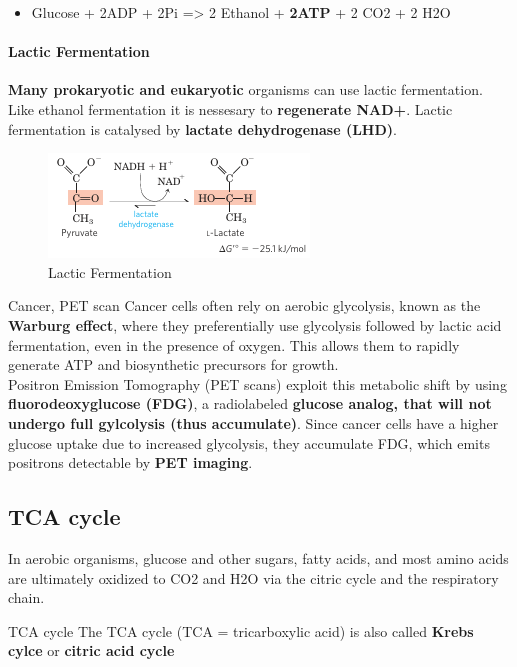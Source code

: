 \documentclass[../main.tex]{subfiles}
\begin{document}
\begin{itemize}
	\item Glucose + 2ADP + 2Pi => 2 Ethanol + \textbf{2ATP} + 2 CO2 + 2 H2O
\end{itemize}

\paragraph{Lactic Fermentation}
\textbf{Many prokaryotic and eukaryotic} organisms can use lactic fermentation. Like ethanol fermentation it is nessesary to \textbf{regenerate NAD+}. Lactic fermentation is catalysed by \textbf{lactate dehydrogenase (LHD)}. 

\begin{figure}[H]
	\centering
	\includegraphics[width = 0.6 \textwidth]{lactic}
	\caption{Lactic Fermentation}
\end{figure}

\begin{RemarkWithTitel}{Cancer, PET scan}
	Cancer cells often rely on aerobic glycolysis, known as the\textbf{ Warburg effect}, where they preferentially use glycolysis followed by lactic acid fermentation, even in the presence of oxygen. This allows them to rapidly generate ATP and biosynthetic precursors for growth.\\
	Positron Emission Tomography (PET scans) exploit this metabolic shift by using \textbf{fluorodeoxyglucose (FDG)}, a radiolabeled \textbf{glucose analog, that will not undergo full gylcolysis (thus accumulate)}. Since cancer cells have a higher glucose uptake due to increased glycolysis, they accumulate FDG, which emits positrons detectable by \textbf{PET imaging}.
\end{RemarkWithTitel}


\subsection{TCA cycle}
In aerobic organisms, glucose and other sugars, fatty acids, and most amino acids are ultimately oxidized to CO2 and H2O via the citric cycle and the respiratory chain. 

\begin{RemarkWithTitel}{TCA cycle}
	The TCA cycle (TCA = tricarboxylic acid) is also called \textbf{Krebs cylce} or \textbf{citric acid cycle}
\end{RemarkWithTitel}
\end{document}

